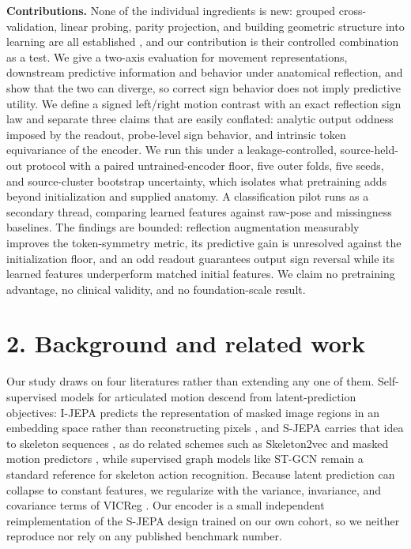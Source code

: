 \documentclass{article}
\begin{document}
\textbf{Contributions.} None of the individual ingredients is new:
grouped cross-validation, linear probing, parity projection, and
building geometric structure into learning are all established
\citep{roberts2017crossvalidation, cohen2016gcnn, bronstein2021gdl}, and
our contribution is their controlled combination as a test. We give a
two-axis evaluation for movement representations, downstream predictive
information and behavior under anatomical reflection, and show that the
two can diverge, so correct sign behavior does not imply predictive
utility. We define a signed left/right motion contrast with an exact
reflection sign law and separate three claims that are easily conflated:
analytic output oddness imposed by the readout, probe-level sign
behavior, and intrinsic token equivariance of the encoder. We run this
under a leakage-controlled, source-held-out protocol with a paired
untrained-encoder floor, five outer folds, five seeds, and
source-cluster bootstrap uncertainty, which isolates what pretraining
adds beyond initialization and supplied anatomy. A classification pilot
runs as a secondary thread, comparing learned features against raw-pose
and missingness baselines. The findings are bounded: reflection
augmentation measurably improves the token-symmetry metric, its
predictive gain is unresolved against the initialization floor, and an
odd readout guarantees output sign reversal while its learned features
underperform matched initial features. We claim no pretraining
advantage, no clinical validity, and no foundation-scale result.

\section{2. Background and related
work}\label{background-and-related-work}

Our study draws on four literatures rather than extending any one of
them. Self-supervised models for articulated motion descend from
latent-prediction objectives: I-JEPA predicts the representation of
masked image regions in an embedding space rather than reconstructing
pixels \citep{assran2023ijepa}, and S-JEPA carries that idea to skeleton
sequences \citep{abdelfattah2024sjepa}, as do related schemes such as
Skeleton2vec \citep{xu2024skeleton2vec} and masked motion predictors
\citep{mao2023mamp}, while supervised graph models like ST-GCN
\citep{yan2018stgcn} remain a standard reference for skeleton action
recognition. Because latent prediction can collapse to constant
features, we regularize with the variance, invariance, and covariance
terms of VICReg \citep{bardes2022vicreg}. Our encoder is a small
independent reimplementation of the S-JEPA design trained on our own
cohort, so we neither reproduce nor rely on any published benchmark
number.
\end{document}

